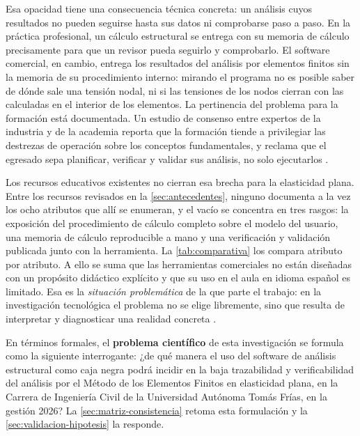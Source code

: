 Esa opacidad tiene una consecuencia técnica concreta: un análisis cuyos resultados no pueden seguirse hasta sus datos ni comprobarse paso a paso. En la práctica profesional, un cálculo estructural se entrega con su memoria de cálculo precisamente para que un revisor pueda seguirlo y comprobarlo. El software comercial, en cambio, entrega los resultados del análisis por elementos finitos sin la memoria de su procedimiento interno: mirando el programa no es posible saber de dónde sale una tensión nodal, ni si las tensiones de los nodos cierran con las calculadas en el interior de los elementos. La pertinencia del problema para la formación está documentada. Un estudio de consenso entre expertos de la industria y de la academia reporta que la formación tiende a privilegiar las destrezas de operación sobre los conceptos fundamentales, y reclama que el egresado sepa planificar, verificar y validar sus análisis, no solo ejecutarlos \autocite[pp.~1159, 1171]{perezsantiago2023fem}.

Los recursos educativos existentes no cierran esa brecha para la elasticidad plana. Entre los recursos revisados en la \autoref{sec:antecedentes}, ninguno documenta a la vez los ocho atributos que allí se enumeran, y el vacío se concentra en tres rasgos: la exposición del procedimiento de cálculo completo sobre el modelo del usuario, una memoria de cálculo reproducible a mano y una verificación y validación publicada junto con la herramienta. La \autoref{tab:comparativa} los compara atributo por atributo. A ello se suma que las herramientas comerciales no están diseñadas con un propósito didáctico explícito \autocite[p.~1160]{perezsantiago2023fem} y que su uso en el aula en idioma español es limitado. Esa es la \emph{situación problemática} de la que parte el trabajo: en la investigación tecnológica el problema no se elige libremente, sino que resulta de interpretar y diagnosticar una realidad concreta \autocite[p.~83]{garciacordoba2005tecnologica}.

En términos formales, el \textbf{problema científico} de esta investigación se formula como la siguiente interrogante: ¿de qué manera el uso del software de análisis estructural como caja negra podrá incidir en la baja trazabilidad y verificabilidad del análisis por el Método de los Elementos Finitos en elasticidad plana, en la Carrera de Ingeniería Civil de la Universidad Autónoma Tomás Frías, en la gestión 2026? La \autoref{sec:matriz-consistencia} retoma esta formulación y la \autoref{sec:validacion-hipotesis} la responde.

